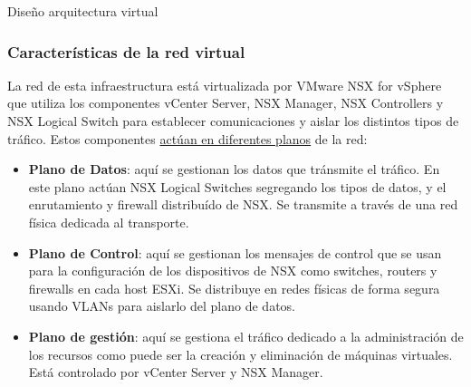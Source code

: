 \begin{subsection}{Diseño arquitectura virtual}
\subsubsection{Características de la red virtual}
La red de esta infraestructura está virtualizada por VMware NSX for vSphere que utiliza los componentes vCenter Server, NSX Manager, NSX Controllers y NSX Logical Switch para establecer comunicaciones y aislar los distintos tipos de tráfico. Estos componentes \underline{actúan en diferentes planos} de la red:
\begin{itemize}
    \item \textbf{Plano de Datos}: aquí se gestionan los datos que tránsmite el tráfico. En este plano actúan NSX Logical Switches segregando los tipos de datos, y el enrutamiento y firewall distribuído de NSX. Se transmite a través de una red física dedicada al transporte.
    \item \textbf{Plano de Control}: aquí se gestionan los mensajes de control que se usan para la configuración de los dispositivos de NSX como switches, routers y firewalls en cada host ESXi. Se distribuye en redes físicas de forma segura usando VLANs para aislarlo del plano de datos.
    \item \textbf{Plano de gestión}: aquí se gestiona el tráfico dedicado a la administración de los recursos como puede ser la creación y eliminación de máquinas virtuales. Está controlado por vCenter Server y NSX Manager.
\end{itemize}


\end{subsection}
